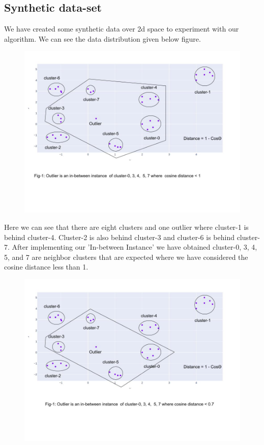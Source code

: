 \documentclass[11pt]{article}
\theoremstyle{definition}
\begin{document}
\subsection{Synthetic data-set}
We have created some synthetic data over 2d space to experiment with our algorithm. We can see the data distribution given below figure.
\begin{figure}[H]
\centering
\includegraphics[scale=.5]{images/angle-1.jpg}\\
\end{figure}
\noindent Here we can see that there are eight clusters and one outlier where cluster-1 is behind cluster-4. Cluster-2 is also behind cluster-3 and cluster-6 is behind cluster-7. After implementing our 'In-between Instance' we have obtained cluster-0, 3, 4, 5, and 7  are neighbor clusters that are expected where we have considered the cosine distance less than 1.
\begin{figure}[H]
\centering
\includegraphics[scale=.5]{images/angle-.7.jpg}\\
\end{figure}
\end{document}
